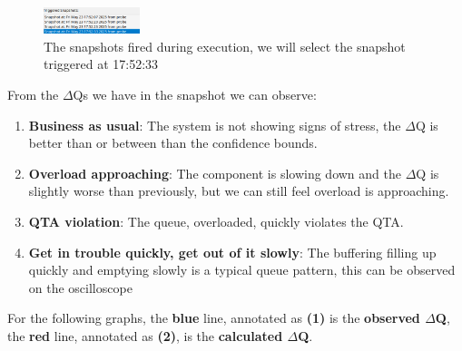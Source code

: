         \begin{figure}
            \caption{The snapshots fired during execution, we will select the snapshot triggered at 17:52:33}\label{wrap-fig:1}
            \includegraphics[width=0.25\textwidth]{img/snapshots.png}
        \end{figure} 

        From the $\Delta$Qs we have in the snapshot we can observe:
        \begin{enumerate}
            \item \textbf{Business as usual}: The system is not showing signs of stress, the $\Delta$Q is better than or between than the confidence bounds.
            \item \textbf{Overload approaching}: The component is slowing down and the $\Delta$Q is  slightly worse than previously, but we can still feel overload is approaching.
            \item \textbf{QTA violation}: The queue, overloaded, quickly violates the QTA.
            \item \textbf{Get in trouble quickly, get out of it slowly}: The buffering filling up quickly and emptying slowly is a typical queue pattern, this can be observed on the oscilloscope
        \end{enumerate}
        
        For the following graphs, the \textbf{blue} line, annotated as \textbf{(1)} is the \textbf{observed $\Delta$Q}, the \textbf{red} line, annotated as \textbf{(2)}, is the \textbf{calculated $\Delta$Q}. 
